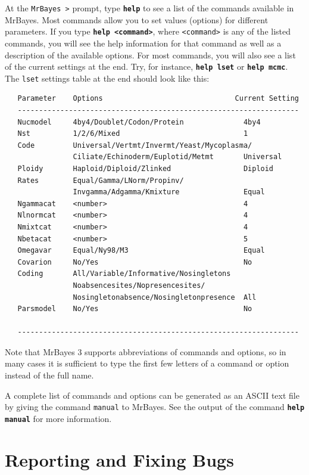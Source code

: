 \documentclass[12pt]{book}
\newcommand{\ttt}[1]{\texttt{#1}}
\newcommand{\tb}[1]{\ttt{\textbf{#1}}}
\begin{document}
At the \ttt{MrBayes >} prompt, type \tb{help} to see a list of the commands available in MrBayes.
Most commands allow you to set values (options) for different parameters. If you type \tb{help
<command>}, where \ttt{<command>} is any of the listed commands, you will see the help information
for that command as well as a description of the available options. For most commands, you will
also see a list of the current settings at the end. Try, for instance, \tb{help lset} or \tb{help
mcmc}. The \ttt{lset} settings table at the end should look like this:

\begin{singlespacing}
\footnotesize
\begin{verbatim}
   Parameter    Options                               Current Setting
   ------------------------------------------------------------------
   Nucmodel     4by4/Doublet/Codon/Protein              4by4
   Nst          1/2/6/Mixed                             1
   Code         Universal/Vertmt/Invermt/Yeast/Mycoplasma/
                Ciliate/Echinoderm/Euplotid/Metmt       Universal
   Ploidy       Haploid/Diploid/Zlinked                 Diploid
   Rates        Equal/Gamma/LNorm/Propinv/
                Invgamma/Adgamma/Kmixture               Equal
   Ngammacat    <number>                                4
   Nlnormcat    <number>                                4
   Nmixtcat     <number>                                4
   Nbetacat     <number>                                5
   Omegavar     Equal/Ny98/M3                           Equal
   Covarion     No/Yes                                  No
   Coding       All/Variable/Informative/Nosingletons
                Noabsencesites/Nopresencesites/
                Nosingletonabsence/Nosingletonpresence  All
   Parsmodel    No/Yes                                  No

   ------------------------------------------------------------------
\end{verbatim}
\normalsize
\end{singlespacing}

Note that MrBayes 3 supports abbreviations of commands and options, so in many cases it is
sufficient to type the first few letters of a command or option instead of the full name.

A complete list of commands and options can be generated as an ASCII text file by giving the
command \ttt{manual} to MrBayes. See the output of the command \tb{help manual} for more
information.

\section{Reporting and Fixing Bugs}
\end{document}
